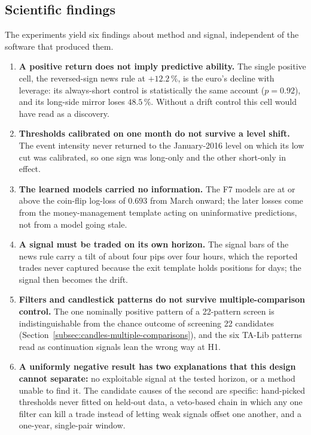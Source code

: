 \subsection{Scientific findings} \label{subsec:scientific-findings}

The experiments yield six findings about method and signal, independent of the software that produced them.

\begin{enumerate}
    \item \textbf{A positive return does not imply predictive ability.} The single positive cell, the reversed-sign news rule at $+12.2\,\%$, is the euro's decline with leverage: its always-short control is statistically the same account ($p = 0.92$), and its long-side mirror loses $48.5\,\%$. Without a drift control this cell would have read as a discovery.
    \item \textbf{Thresholds calibrated on one month do not survive a level shift.} The event intensity never returned to the January-2016 level on which its low cut was calibrated, so one sign was long-only and the other short-only in effect.
    \item \textbf{The learned models carried no information.} The F7 models are at or above the coin-flip log-loss of $0.693$ from March onward; the later losses come from the money-management template acting on uninformative predictions, not from a model going stale.
    \item \textbf{A signal must be traded on its own horizon.} The signal bars of the news rule carry a tilt of about four pips over four hours, which the reported trades never captured because the exit template holds positions for days; the signal then becomes the drift.
    \item \textbf{Filters and candlestick patterns do not survive multiple-comparison control.} The one nominally positive pattern of a 22-pattern screen is indistinguishable from the chance outcome of screening 22 candidates (Section~\ref{subsec:candles-multiple-comparisons}), and the six TA-Lib patterns read as continuation signals lean the wrong way at H1.
    \item \textbf{A uniformly negative result has two explanations that this design cannot separate:} no exploitable signal at the tested horizon, or a method unable to find it. The candidate causes of the second are specific: hand-picked thresholds never fitted on held-out data, a veto-based chain in which any one filter can kill a trade instead of letting weak signals offset one another, and a one-year, single-pair window.
\end{enumerate}

